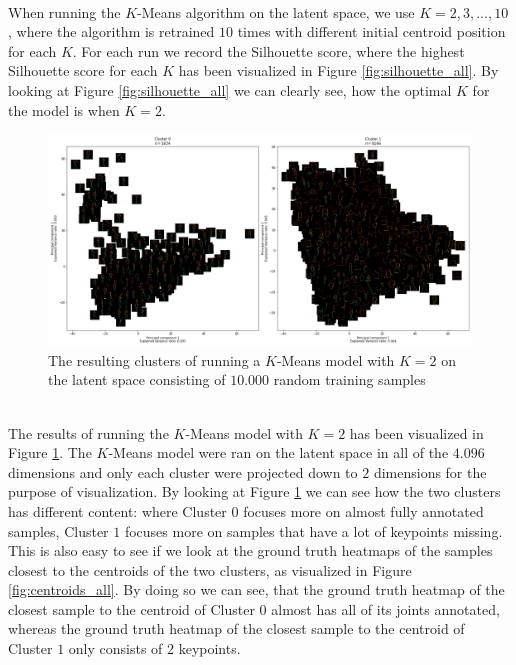 \documentclass[./main.tex]{subfiles}
\begin{document}
\\
When running the $K$-Means algorithm on the latent space, we use $K = 2, 3, ..., 10$, where the algorithm is retrained $10$ times with different initial centroid position for each $K$. For each run we record the Silhouette score, where the highest Silhouette score for each $K$ has been visualized in Figure \ref{fig:silhouette_all}. By looking at Figure \ref{fig:silhouette_all} we can clearly see, how the optimal $K$ for the model is when $K = 2$.
\\
\begin{figure}[t]
    \centering
    \includegraphics[width = \textwidth]{entities/cluster_all_skeletons.png}
    \caption{The resulting clusters of running a $K$-Means model with $K = 2$ on the latent space consisting of $10.000$ random training samples}
    \label{fig:clusters_all_skeletons}
\end{figure}
\\
The results of running the $K$-Means model with $K = 2$ has been visualized in Figure \ref{fig:clusters_all_skeletons}. The $K$-Means model were ran on the latent space in all of the $4.096$ dimensions and only each cluster were projected down to $2$ dimensions for the purpose of visualization. By looking at Figure \ref{fig:clusters_all_skeletons} we can see how the two clusters has different content: where Cluster $0$ focuses more on almost fully annotated samples, Cluster $1$ focuses more on samples that have a lot of keypoints missing. This is also easy to see if we look at the ground truth heatmaps of the samples closest to the centroids of the two clusters, as visualized in Figure \ref{fig:centroids_all}. By doing so we can see, that the ground truth heatmap of the closest sample to the centroid of Cluster $0$ almost has all of its joints annotated, whereas the ground truth heatmap of the closest sample to the centroid of Cluster $1$ only consists of $2$ keypoints.
\end{document}
